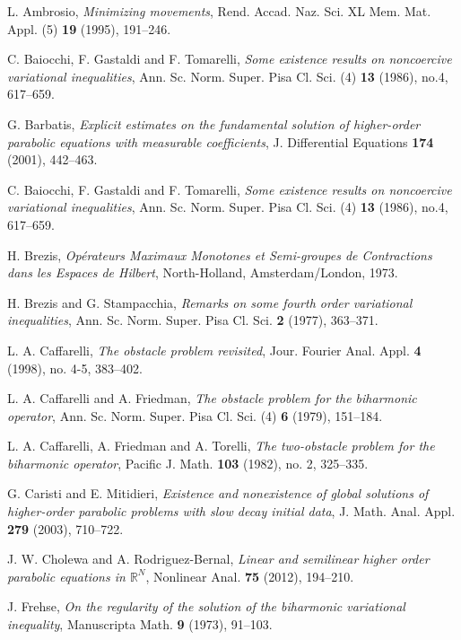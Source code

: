 \documentclass[12pt]{amsart}
\begin{document}
\begin{thebibliography}{99}

  L. Ambrosio, {\it Minimizing movements}, 
Rend. Accad. Naz. Sci. XL Mem. Mat. Appl. (5) {\bf 19} (1995), 191--246. 

 C. Baiocchi, F. Gastaldi and F. Tomarelli, {\it Some existence results on noncoercive variational inequalities}, Ann. Sc. Norm. Super. Pisa Cl. Sci. (4) {\bf 13} (1986), no.4, 617--659. 

  G. Barbatis, {\it Explicit estimates on the fundamental solution of higher-order parabolic 
 equations with measurable coefficients}, 
J. Differential Equations {\bf 174} (2001), 442--463. 

 C. Baiocchi, F. Gastaldi and F. Tomarelli, {\it Some existence results on noncoercive variational inequalities}, Ann. Sc. Norm. Super. Pisa Cl. Sci. (4) {\bf 13} (1986), no.4, 617--659. 

   H. Brezis, 
{\it Op\'erateurs Maximaux Monotones et Semi-groupes de Contractions dans les Espaces de Hilbert}, 
North-Holland, Amsterdam/London, 1973. 

  H. Brezis and G. Stampacchia, {\it Remarks on some fourth order variational inequalities}, 
Ann. Sc. Norm. Super. Pisa Cl. Sci. {\bf 2} (1977), 363--371. 

 L. A. Caffarelli, {\it The obstacle problem revisited}, 
Jour. Fourier Anal. Appl. {\bf 4} (1998), no. 4-5, 383--402.

  L. A. Caffarelli and A. Friedman, {\it The obstacle problem for the biharmonic operator}, 
Ann. Sc. Norm. Super. Pisa Cl. Sci. (4) {\bf 6} (1979), 151--184. 

  L. A. Caffarelli, A. Friedman and A. Torelli, {\it The two-obstacle problem for the biharmonic operator}, 
Pacific J. Math. {\bf 103} (1982), no. 2, 325--335. 

G. Caristi and E. Mitidieri, 
{\it Existence and nonexistence of global solutions of higher-order parabolic problems with slow decay initial data}, 
J. Math. Anal. Appl. {\bf 279} (2003), 710--722.

J. W. Cholewa and A. Rodriguez-Bernal, 
{\it Linear and semilinear higher order parabolic equations in ${\mathbb{R}}^{N}$}, 
Nonlinear Anal. {\bf 75} (2012), 194--210.

  J. Frehse, {\it On the regularity of the solution of the biharmonic variational inequality}, 
Manuscripta Math. {\bf 9} (1973), 91--103.  


\end{thebibliography}
\end{document}

